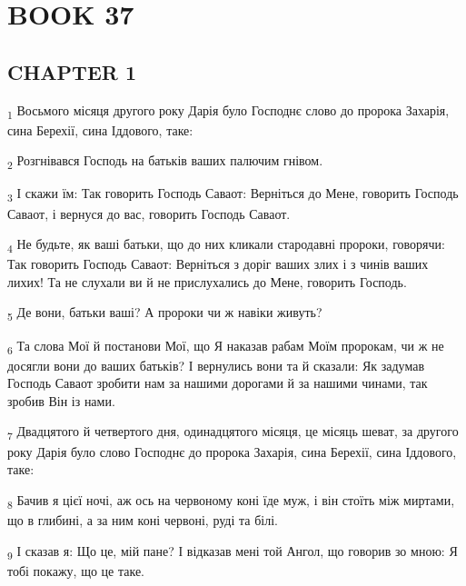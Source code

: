 \section{BOOK 37}
\subsection{CHAPTER 1}
\begin{tcolorbox}
\textsubscript{1} Восьмого місяця другого року Дарія було Господнє слово до пророка Захарія, сина Берехії, сина Іддового, таке:
\end{tcolorbox}
\begin{tcolorbox}
\textsubscript{2} Розгнівався Господь на батьків ваших палючим гнівом.
\end{tcolorbox}
\begin{tcolorbox}
\textsubscript{3} І скажи їм: Так говорить Господь Саваот: Верніться до Мене, говорить Господь Саваот, і вернуся до вас, говорить Господь Саваот.
\end{tcolorbox}
\begin{tcolorbox}
\textsubscript{4} Не будьте, як ваші батьки, що до них кликали стародавні пророки, говорячи: Так говорить Господь Саваот: Верніться з доріг ваших злих і з чинів ваших лихих! Та не слухали ви й не прислухались до Мене, говорить Господь.
\end{tcolorbox}
\begin{tcolorbox}
\textsubscript{5} Де вони, батьки ваші? А пророки чи ж навіки живуть?
\end{tcolorbox}
\begin{tcolorbox}
\textsubscript{6} Та слова Мої й постанови Мої, що Я наказав рабам Моїм пророкам, чи ж не досягли вони до ваших батьків? І вернулись вони та й сказали: Як задумав Господь Саваот зробити нам за нашими дорогами й за нашими чинами, так зробив Він із нами.
\end{tcolorbox}
\begin{tcolorbox}
\textsubscript{7} Двадцятого й четвертого дня, одинадцятого місяця, це місяць шеват, за другого року Дарія було слово Господнє до пророка Захарія, сина Берехії, сина Іддового, таке:
\end{tcolorbox}
\begin{tcolorbox}
\textsubscript{8} Бачив я цієї ночі, аж ось на червоному коні їде муж, і він стоїть між миртами, що в глибині, а за ним коні червоні, руді та білі.
\end{tcolorbox}
\begin{tcolorbox}
\textsubscript{9} І сказав я: Що це, мій пане? І відказав мені той Ангол, що говорив зо мною: Я тобі покажу, що це таке.
\end{tcolorbox}
